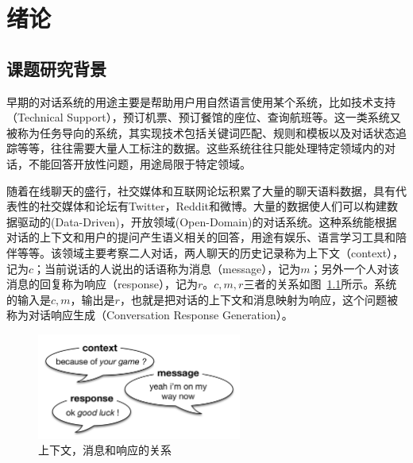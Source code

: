 
\chapter{绪论}\label{ch:绪论}

\section{课题研究背景}\label{sec:课题研究背景}
早期的对话系统的用途主要是帮助用户用自然语言使用某个系统，比如技术支持（Technical Support），预订机票、预订餐馆的座位、查询航班等。这一类系统又被称为任务导向的系统，其实现技术包括关键词匹配、规则和模板以及对话状态追踪等等，往往需要大量人工标注的数据。这些系统往往只能处理特定领域内的对话，不能回答开放性问题，用途局限于特定领域。

随着在线聊天的盛行，社交媒体和互联网论坛积累了大量的聊天语料数据，具有代表性的社交媒体和论坛有Twitter，Reddit和微博。大量的数据使人们可以构建数据驱动的(Data-Driven)，开放领域(Open-Domain)的对话系统。这种系统能根据对话的上下文和用户的提问产生语义相关的回答，用途有娱乐、语言学习工具和陪伴等等。该领域主要考察二人对话，两人聊天的历史记录称为上下文（context），记为$c$；当前说话的人说出的话语称为消息（message），记为$m$；另外一个人对该消息的回复称为响应（response），记为$r$。$c,m,r$三者的关系如图~\ref{fig:context_message_response}所示。系统的输入是$c,m$，输出是$r$，也就是把对话的上下文和消息映射为响应，这个问题被称为对话响应生成（Conversation Response Generation）。

\begin{figure}[H]
    \includegraphics[width=0.6\textwidth]{figure/context_message_response.png}
    \centering
    \caption{上下文，消息和响应的关系}
    \label{fig:context_message_response}
\end{figure}

